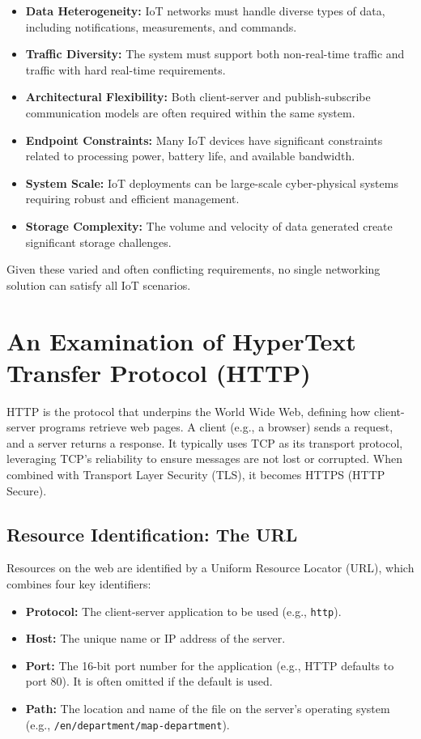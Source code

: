 \documentclass[a4paper, 12pt]{book} %
\begin{document}
\begin{itemize}
\tightlist
\item
  \textbf{Data Heterogeneity:} IoT networks must handle diverse types of
  data, including notifications, measurements, and commands.
\item
  \textbf{Traffic Diversity:} The system must support both non-real-time
  traffic and traffic with hard real-time requirements.
\item
  \textbf{Architectural Flexibility:} Both client-server and
  publish-subscribe communication models are often required within the
  same system.
\item
  \textbf{Endpoint Constraints:} Many IoT devices have significant
  constraints related to processing power, battery life, and available
  bandwidth.
\item
  \textbf{System Scale:} IoT deployments can be large-scale
  cyber-physical systems requiring robust and efficient management.
\item
  \textbf{Storage Complexity:} The volume and velocity of data generated
  create significant storage challenges.
\end{itemize}

Given these varied and often conflicting requirements, no single
networking solution can satisfy all IoT scenarios.

\section{An Examination of HyperText Transfer Protocol
(HTTP)}\label{an-examination-of-hypertext-transfer-protocol-http}

HTTP is the protocol that underpins the World Wide Web, defining how
client-server programs retrieve web pages. A client (e.g., a browser)
sends a request, and a server returns a response. It typically uses TCP
as its transport protocol, leveraging TCP's reliability to ensure
messages are not lost or corrupted. When combined with Transport Layer
Security (TLS), it becomes HTTPS (HTTP Secure).

\subsection{Resource Identification: The
URL}\label{resource-identification-the-url}

Resources on the web are identified by a Uniform Resource Locator (URL),
which combines four key identifiers:

\begin{itemize}
\tightlist
\item
  \textbf{Protocol:} The client-server application to be used (e.g.,
  \texttt{http}).
\item
  \textbf{Host:} The unique name or IP address of the server.
\item
  \textbf{Port:} The 16-bit port number for the application (e.g., HTTP
  defaults to port 80). It is often omitted if the default is used.
\item
  \textbf{Path:} The location and name of the file on the server's
  operating system (e.g., \texttt{/en/department/map-department}).
\end{itemize}
\end{document}
